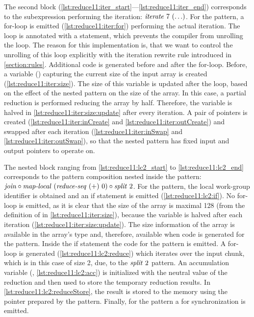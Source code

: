 The second block (\autoref{lst:reduce11:iter_start}---\autoref{lst:reduce11:iter_end}) corresponds to the subexpression performing the iteration:
$\text{\textit{iterate}}\ 7\ (\ldots)$.
For the \iterateN pattern, a for-loop is emitted (\autoref{lst:reduce11:iter:for}) performing the actual iteration.
The loop is annotated with a  statement, which prevents the \OpenCL compiler from unrolling the loop.
The reason for this implementation is, that we want to control the unrolling of this loop explicitly with the iteration rewrite rule introduced in \autoref{section:rules}.
Additional code is generated before and after the for-loop.
Before, a variable () capturing the current size of the input array is created (\autoref{lst:reduce11:iter:size}).
The size of this variable is updated after the loop, based on the effect of the nested pattern on the size of the array.
In this case, a partial reduction is performed reducing the array by half.
Therefore, the  variable is halved in \autoref{lst:reduce11:iter:size:update} after every iteration.
A pair of pointers is created (\autoref{lst:reduce11:iter:inCreate} and \autoref{lst:reduce11:iter:outCreate}) and swapped after each iteration (\autoref{lst:reduce11:iter:inSwap} and \autoref{lst:reduce11:iter:outSwap}), so that the nested pattern has fixed input and output pointers to operate on.

The nested block ranging from \autoref{lst:reduce11:lc2_start} to \autoref{lst:reduce11:lc2_end} corresponds to the pattern composition nested inside the \iterateN pattern:
$\text{\textit{join}} \circ \text{\textit{map-local}}\ (\text{\textit{reduce-seq}}\ (+)\ 0) \circ \text{\textit{split}}\ 2$.
For the \mapLocal pattern, the local work-group identifier is obtained and an if statement is emitted (\autoref{lst:reduce11:lc2:if}).
No for-loop is emitted, as it is clear that the size of the array is maximal 128 (from the definition of  in \autoref{lst:reduce11:iter:size}), because the variable is halved after each iteration (\autoref{lst:reduce11:iter:size:update}).
The size information of the array is available in the array's type and, therefore, available when code is generated for the \mapLocal pattern.
Inside the if statement the code for the \reduceSeq pattern is emitted.
A for-loop is generated (\autoref{lst:reduce11:lc2:reduce}) which iterates over the input chunk, which is in this case of size 2, due, to the $\text{\textit{split}}\ 2$ pattern.
An accumulation variable (, \autoref{lst:reduce11:lc2:acc}) is initialized with the neutral value of the reduction and then used to store the temporary reduction results.
In \autoref{lst:reduce11:lc2:reduceStore}, the result is stored to the memory using the  pointer prepared by the \iterateN pattern.
Finally, for the \mapLocal pattern a  for synchronization is emitted.

